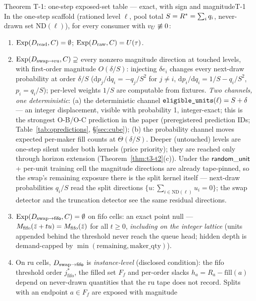 \begin{preregthm}{Theorem T-1: one-step exposed-set table --- exact, with sign
and magnitude}{T-1}
\label{thm:t3-t1}
In the one-step scaffold (rationed level $\ell$, pool total
$S = R^{*} = \sum_i q_i$, never-drawn set $\mathrm{ND}(\ell)$), for every
consumer with $v_{U} \not\equiv 0$:
\begin{enumerate}
\item $\operatorname{Exp}(D_{\mathrm{read}}, C) = \emptyset$; $\operatorname{Exp}(D_{\mathrm{raw}}, C) = U(\tau)$.
\item $\operatorname{Exp}(D_{\mathrm{swap}\to\mathrm{ru}}, C) \supseteq$ every nonzero magnitude direction at
touched levels, with first-order magnitude $O(\delta/S)$: injecting
$\delta e_i$ changes every next-draw probability at order $\delta/S$
($\mathrm{d}p_j/\mathrm{d}q_i = -q_j/S^2$ for $j \ne i$,
$\mathrm{d}p_i/\mathrm{d}q_i = 1/S - q_i/S^2$, $p_i = q_i/S$); per-level
weights $1/S$ are computable from fixtures. \emph{Two channels, one
deterministic}: (a) the deterministic channel
$\fld{eligible\_units}(\ell) = S + \delta$ --- an integer displacement,
visible with probability 1, integer-exact; this is the strongest O-B/O-C
prediction in the paper (preregistered prediction IDs;
Table~\ref{tab:opredictions}, \S\ref{sec:cube}); (b) the probability channel moves expected
per-maker fill counts at $\Theta(\delta/S)$. Deeper (untouched) levels are
one-step silent under both kernels (price priority); they are reached only
through horizon extension (Theorem~\ref{thm:t3-t2}(c)). Under the
$\mathsf{random\_unit}$ + per-unit training cell the magnitude directions are already
tape-pinned, so the swap's remaining exposure there is the split kernel
itself --- next-draw probabilities $q_i/S$ read the split directions
$\{u : \sum_{i \in \mathrm{ND}(\ell)} u_i = 0\}$; the swap detector and the
truncation detector see the same residual directions.
\item $\operatorname{Exp}(D_{\mathrm{swap}\to\mathsf{fifo}}, C) = \emptyset$ on fifo cells: an exact point
null --- $M_{\mathrm{fifo}}(\bar{z} + t u) = M_{\mathrm{fifo}}(\bar{z})$ for all
$t \ge 0$, \emph{including on the integer lattice} (units appended behind
the threshold never reach the queue head; hidden depth is demand-capped by
$\min(\mathrm{remaining}, \mathrm{maker\_qty})$).
\item On ru cells, $D_{\mathrm{swap}\to\mathsf{fifo}}$ is \emph{instance-level} (disclosed
condition): the fifo threshold order $j^{*}_{\mathrm{fifo}}$, the filled set
$F_f$ and per-order slacks $h_a = R_a - \mathrm{fill}(a)$ depend on
never-drawn quantities that the ru tape does not record. Splits with an
endpoint $a \in F_f$ are exposed with magnitude

\end{enumerate}
\end{preregthm}
